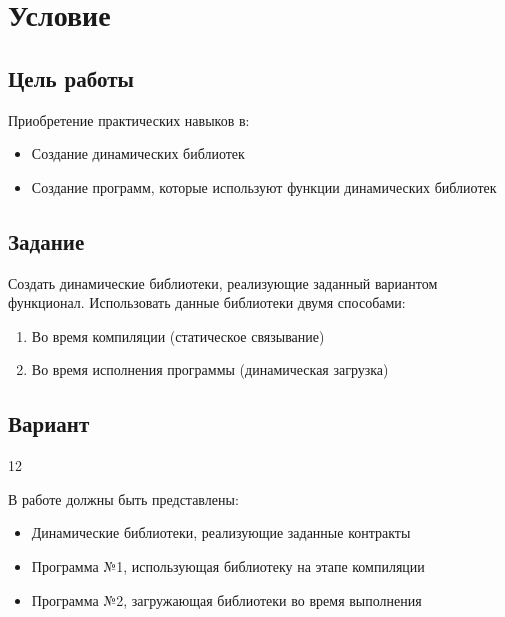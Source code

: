 \section{Условие}

\subsection{Цель работы}
Приобретение практических навыков в:
\begin{itemize}
    \item Создание динамических библиотек
    \item Создание программ, которые используют функции динамических библиотек
\end{itemize}

\subsection{Задание}
Создать динамические библиотеки, реализующие заданный вариантом функционал. Использовать данные библиотеки двумя способами:
\begin{enumerate}
    \item Во время компиляции (статическое связывание)
    \item Во время исполнения программы (динамическая загрузка)
\end{enumerate}

\subsection*{Вариант} 12

В работе должны быть представлены:
\begin{itemize}
    \item Динамические библиотеки, реализующие заданные контракты
    \item Программа №1, использующая библиотеку на этапе компиляции
    \item Программа №2, загружающая библиотеки во время выполнения
\end{itemize}
